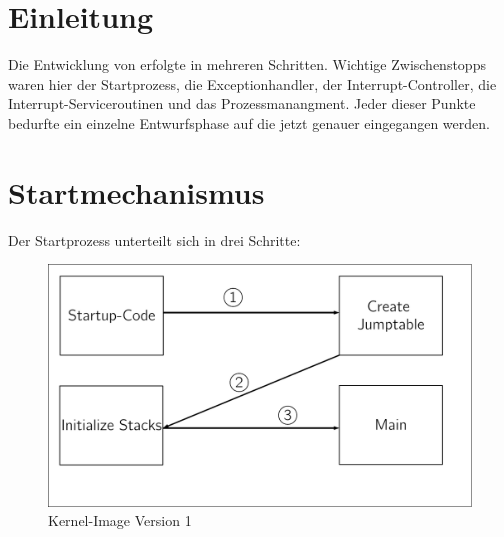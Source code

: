 \section{Einleitung}
Die Entwicklung von \mops erfolgte in mehreren Schritten. Wichtige Zwischenstopps waren hier der Startprozess, die Exceptionhandler, der Interrupt-Controller, die Interrupt-Serviceroutinen und das Prozessmanangment. Jeder dieser Punkte bedurfte ein einzelne Entwurfsphase auf die jetzt genauer eingegangen werden.
\section{Startmechanismus}
\label{e1:start}
Der Startprozess unterteilt sich in drei Schritte:

	\begin{figure}[h]
		\centering
					\includegraphics[scale=0.60]{common/kernel-img.pdf}	
		\caption{Kernel-Image Version 1}
		\label{draft:kernelImage}
	\end{figure}
